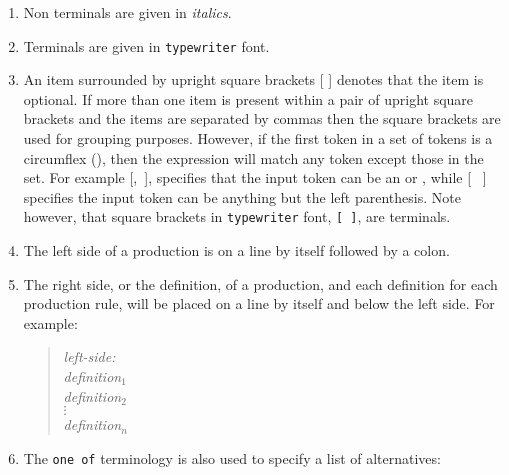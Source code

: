 \begin{enumerate}
\item    Non terminals are given in {\it italics}.
\item    Terminals are given in {\tt typewriter} font.
\item    

	An item surrounded by upright square brackets [ ] denotes that
	the item is optional. If more than one item is present within
	a pair of upright square brackets and the items are separated
	by commas then the square brackets are used for grouping
	purposes. However, if the first token in a set of tokens is a
	circumflex (\circumflex), then the expression will match any
	token except those in the set. For example
	[,~], specifies that the input token can be an
	 or , while [\circumflex~\T{(} ] specifies the input
	token can be anything but the left parenthesis.  Note however,
	that square brackets in {\tt typewriter} font, {\tt [~]}, are
	terminals.

\item   The left side of a production is on a line by itself
	followed by a colon.
\item	The right side, or the definition, of a production, 
	and each definition for each production rule, will be placed
	on a line by itself and below the left side. For example:
	\begin{quote}
		{\it left-side:}\\
		{\it \hspace*{1cm} definition$_1$} \\
		{\it \hspace*{1cm} definition$_2$} \\
		{\it \hspace*{1.5cm} $\vdots$} \\
		{\it \hspace*{1cm} definition$_n$}

	\end{quote}

\item   
	The {\tt one of} terminology is also used to specify a list of
	alternatives:

	\begin{quote} 
	\end{quote}


\end{enumerate}
